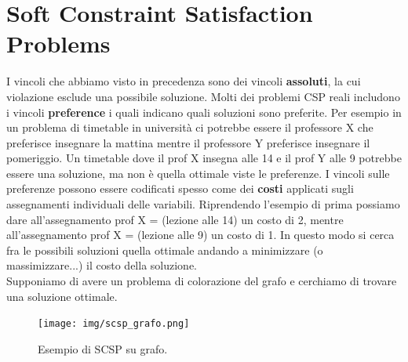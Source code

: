 \section{Soft Constraint Satisfaction Problems}
I vincoli che abbiamo visto in precedenza sono dei vincoli \textbf{assoluti}, la cui violazione esclude una possibile soluzione. Molti dei problemi CSP reali includono i vincoli \textbf{preference} i quali indicano quali soluzioni sono preferite. Per esempio in un problema di timetable in università ci potrebbe essere il professore X che preferisce insegnare la mattina mentre il professore Y preferisce insegnare il pomeriggio. Un timetable dove il prof X insegna alle 14 e il prof Y alle 9 potrebbe essere una soluzione, ma non è quella ottimale viste le preferenze. I vincoli sulle preferenze possono essere codificati spesso come dei \textbf{costi} applicati sugli assegnamenti individuali delle variabili. Riprendendo l'esempio di prima possiamo dare all'assegnamento prof X = (lezione alle 14) un costo di 2, mentre all'assegnamento prof X = (lezione alle 9) un costo di 1. In questo modo si cerca fra le possibili soluzioni quella ottimale andando a minimizzare (o massimizzare...) il costo della soluzione. \\
Supponiamo di avere un problema di colorazione del grafo e cerchiamo di trovare una soluzione ottimale. 
\begin{figure}[H]
    \centering
    \texttt{[image: img/scsp\_grafo.png]}
    \caption{Esempio di SCSP su grafo.}\label{fig:scps_grafo}
\end{figure}

